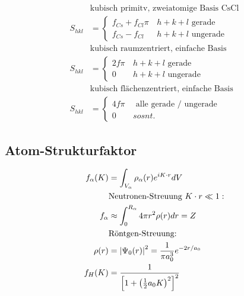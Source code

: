 \begin{equation*}
    \begin{aligned}
        &\text{kubisch primitv, zweiatomige Basis CsCl} \\
        S_{hkl} &= \begin{cases}
            f_{Cs} + f_{Cl} \pi & \, h+k+l \text{ gerade} \\
            f_{Cs} - f_{Cl} & \, h+k+l \text{ ungerade}
            \end{cases} \\
        &\text{kubisch raumzentriert, einfache Basis} \\
        S_{hkl} &= \begin{cases}
            2f \pi & \, h+k+l \text{ gerade} \\
            0 & \, h+k+l \text{ ungerade}
            \end{cases} \\
        &\text{kubisch flächenzentriert, einfache Basis} \\
        S_{hkl} &= \begin{cases}
            4f \pi & \, \text{ alle gerade / ungerade} \\
            0 & \, sosnt.
            \end{cases}
    \end{aligned}
\end{equation*}

\subsection*{Atom-Strukturfaktor}

\begin{equation*}
    \begin{aligned}
        f_\alpha  (K) &= \int_{V_\alpha} \rho_{\alpha} (r) e^{i K \cdot r} dV \\
        & \text{Neutronen-Streuung } K\cdot r \ll 1: \\
        f_{\alpha} &\approx \int_0^{R_\alpha} 4 \pi r^2 \rho(r) dr = Z \\
        & \text{Röntgen-Streuung:} \\
        \rho(r) &= \left\vert\Psi_0(r)\right\vert^2 = \frac{1}{\pi a_0^3} e^{-2r/a_0} \\
        f_H(K) &= \frac{1}{\left[1+ \left(\frac{1}{2}a_0K\right)^2\right]^2}
    \end{aligned}
\end{equation*}